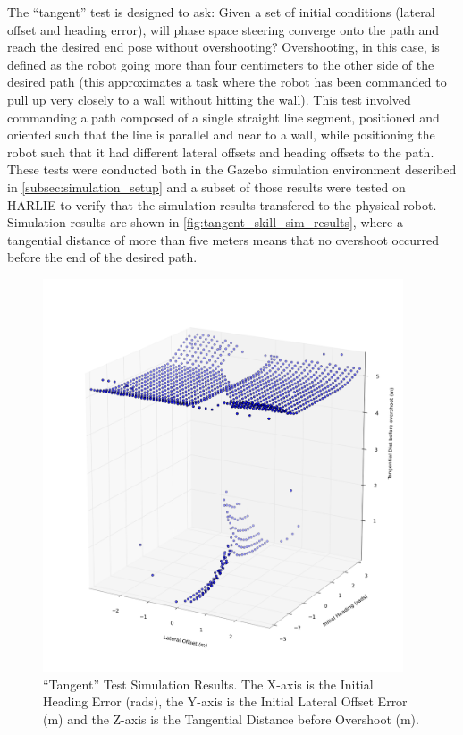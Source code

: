 The ``tangent'' test is designed to ask: Given a set of initial conditions (lateral offset and heading error), will phase space steering converge onto the path and reach the desired end pose without overshooting? Overshooting, in this case, is defined as the robot going more than four centimeters to the other side of the desired path (this approximates a task where the robot has been commanded to pull up very closely to a wall without hitting the wall). This test involved commanding a path composed of a single straight line segment, positioned and oriented such that the line is parallel and near to a wall, while positioning the robot such that it had different lateral offsets and heading offsets to the path. These tests were conducted both in the Gazebo simulation environment described in \autoref{subsec:simulation_setup} and a subset of those results were tested on HARLIE to verify that the simulation results transfered to the physical robot. Simulation results are shown in \autoref{fig:tangent_skill_sim_results}, where a tangential distance of more than five meters means that no overshoot occurred before the end of the desired path.

\begin{figure}
\centering
\includegraphics[width=0.95\textwidth]{images/acceptable_overshoot_scatter}
\caption[``Tangent'' Test Simulation Results]{``Tangent'' Test Simulation Results. The X-axis is the Initial Heading Error (rads), the Y-axis is the Initial Lateral Offset Error (m) and the Z-axis is the Tangential Distance before Overshoot (m).}
\label{fig:tangent_skill_sim_results}
\end{figure}

